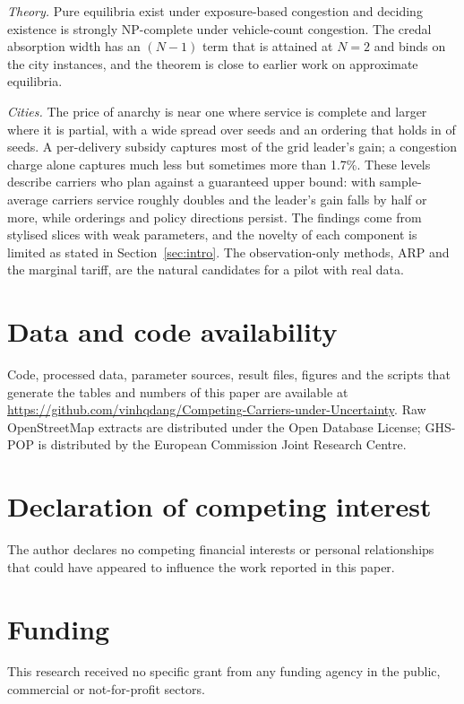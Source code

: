 \documentclass[preprint,11pt]{elsarticle}
\theoremstyle{definition}
\theoremstyle{remark}
\begin{document}
\emph{Theory.} Pure equilibria exist under exposure-based congestion and deciding existence is strongly NP-complete under vehicle-count congestion. The credal absorption width has an $(N-1)$ term that is attained at $N=2$ and binds on the city instances, and the theorem is close to earlier work on approximate equilibria.

\emph{Cities.} The price of anarchy is near one where service is complete and larger where it is partial, with a wide spread over seeds and an ordering that holds in \TenPoaOrderAll{} of \TenPoaOrderN{} seeds. A per-delivery subsidy captures most of the grid leader's gain; a congestion charge alone captures much less but sometimes more than 1.7\%. These levels describe carriers who plan against a guaranteed upper bound: with sample-average carriers service roughly doubles and the leader's gain falls by half or more, while orderings and policy directions persist. The findings come from stylised slices with weak parameters, and the novelty of each component is limited as stated in Section~\ref{sec:intro}. The observation-only methods, ARP and the marginal tariff, are the natural candidates for a pilot with real data.

\section*{Data and code availability}
Code, processed data, parameter sources, result files, figures and the scripts that generate the tables and numbers of this paper are available at \url{https://github.com/vinhqdang/Competing-Carriers-under-Uncertainty}. Raw OpenStreetMap extracts are distributed under the Open Database License; GHS-POP is distributed by the European Commission Joint Research Centre.

\section*{Declaration of competing interest}
The author declares no competing financial interests or personal relationships that could have appeared to influence the work reported in this paper.

\section*{Funding}
This research received no specific grant from any funding agency in the public, commercial or not-for-profit sectors.



\end{document}
